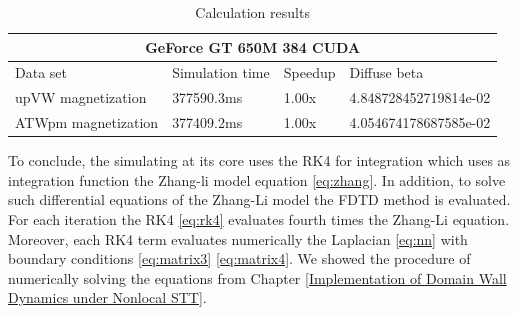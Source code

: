 \begin{table}[h]
\centering
\begin{tabular}{| l | l | l | l |}
\hline
\multicolumn{4}{|c|}{GeForce GT 650M  384 CUDA} \\
\hline
Data set & Simulation time & Speedup & Diffuse beta  \\
\hline
upVW magnetization & 377590.3ms & 1.00x & 4.848728452719814e-02 \\
\hline
ATWpm magnetization & 377409.2ms & 1.00x & 4.054674178687585e-02 \\
\hline
\end{tabular}
\caption{Calculation results}
\label{tab:results}
\end{table}


\vspace{4.0em}

To conclude, the simulating at its core uses the RK4 for integration which uses as integration function the Zhang-li model equation \ref{eq:zhang}. In addition, to solve such differential equations of the Zhang-Li model the FDTD method is evaluated. For each iteration the RK4 \ref{eq:rk4} evaluates fourth times the Zhang-Li equation. Moreover, each RK4 term evaluates numerically the Laplacian \ref{eq:nn} with boundary conditions \ref{eq:matrix3} \ref{eq:matrix4}. We showed the procedure of numerically solving the equations from Chapter \ref{Implementation of Domain Wall Dynamics under Nonlocal STT}.



